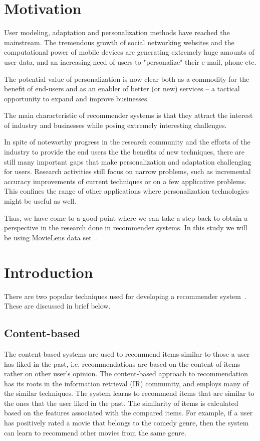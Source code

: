 \section{Motivation}

 User modeling, adaptation and personalization methods have reached the mainstream. The tremendous growth of social networking websites and the computational power of mobile devices are generating extremely huge amounts of user data, and an increasing need of users to "personalize" their e-mail, phone etc.

 The potential value of personalization is now clear both as a commodity for the benefit of end-users and as an enabler of better (or new) services – a tactical opportunity to expand and improve businesses.

 The main characteristic of recommender systems is that they attract the interest of industry and businesses while posing extremely interesting challenges.

 In spite of noteworthy progress in the research community and the efforts of the industry to provide the end users the the benefits of new techniques, there are still many important gaps that make personalization and adaptation challenging for users. Research activities still focus on narrow problems, such as incremental accuracy improvements of current techniques or on a few applicative problems. This confines the range of other applications where personalization technologies might be useful as well.

 Thus, we have come to a good point where we can take a step back to obtain a perspective in the research done in recommender systems. In this study we will be using MovieLens data set~\cite{movielens}.

\section{Introduction}
\label{sec:approaches}
There are two popular techniques used for developing a recommender system~\cite{nbrsurvey}. These are discussed in brief below.
\subsection{Content-based}
 The content-based systems are used to recommend items similar to those a user has liked in the past, i.e. recommendations are based on the content of items rather on other user's opinion. The content-based approach to recommendation has its roots in the information retrieval (IR) community, and employs many of the similar techniques. The system learns to recommend items that are similar to the ones that the user liked in the past. The similarity of items is calculated based on the features associated with the compared items. For example, if a user has positively rated a movie that belongs to the comedy genre, then the system can learn to recommend other movies from the same genre.
